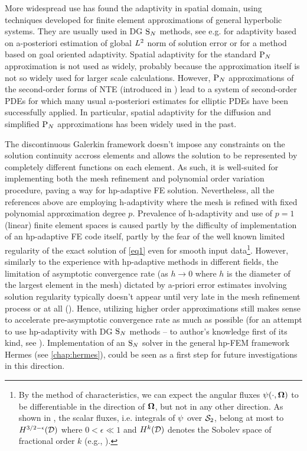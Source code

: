 More widespread use has found the adaptivity in spatial domain, using techniques developed for finite element
approximations of general hyperbolic systems. They are usually used in DG $\SN$ methods, see e.g.
\cite{Fournier,Duo,ragusa2010two} for adaptivity based on a-posteriori estimation of global $\Lp[2]$ norm of solution
error or \cite{LathouwersGoal, Wang2} for a method based on goal oriented adaptivity. Spatial adaptivity for the
standard $\PN$ approximation is not used as widely, probably because the approximation itself is not so widely used for
larger scale calculations. However, $\PN$ approximations of the second-order forms of NTE (introduced in
) lead to a system of second-order PDEs for which many usual a-posteriori estimates for elliptic 
PDEs have been successfully applied. In particular, spatial adaptivity for the diffusion and simplified $\PN$
approximations has been widely used in the past.
 
The discontinuous Galerkin framework doesn't impose any constraints on the solution
continuity accross elements and allows the solution to be represented by completely different functions on each element.
As such, it is well-suited for implementing both the mesh refinement and polynomial order variation procedure, paving a
way for hp-adaptive FE solution.
Nevertheless, all the references above are employing h-adaptivity where the mesh is refined with fixed polynomial
approximation degree $p$. Prevalence of h-adaptivity and use of $p=1$ (linear) finite element spaces is caused partly
by the difficulty of implementation of an hp-adaptive FE code itself, partly by the fear of the well known limited
regularity of the exact solution of \eqref{eq1} even for smooth input data\footnote{By the method of characteristics, we
can expect the angular fluxes $\angflux(\cdot,\bomega)$ to be differentiable in the direction of $\bomega$, but not in
any other direction. As shown in \cite{Johnson}, the scalar fluxes, i.e. integrals of $\angflux$ over $\Sphere$, belong
at most to $H^{3/2-\epsilon}(\VV)$ where $0 < \epsilon \ll 1$ and $H^{k}(\VV)$ denotes the Sobolev space of fractional
order $k$ (e.g., \cite[Sec. 9.2]{demkowicz}).}.
However, similarly to the experience with hp-adaptive methods in different fields, the limitation of asymptotic
convergence rate (as $h\to 0$ where $h$ is the diameter of the largest element in the mesh) dictated by a-priori error
estimates involving solution regularity typically doesn't appear until very late in the mesh refinement process or at
all (\cite{wang2009convergence}). Hence, utilizing higher order approximations still makes sense to accelerate
pre-asymptotic convergence rate as much as possible (for an attempt to use hp-adaptivity with DG $\SN$ methods -- to
author's knowledge first of its kind, see \cite{FournierDGHP}). Implementation of an $\SN$ solver in the general hp-FEM
framework Hermes (see \cref{chap:hermes}), could be seen as a first step for future investigations in this
direction.



